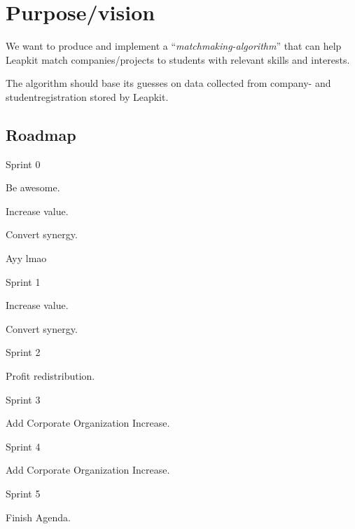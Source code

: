 \section{Purpose/vision}

We want to produce and implement a ``\emph{matchmaking-algorithm}''
that can help Leapkit match companies/projects to students with relevant
skills and interests.

The algorithm should base its guesses on data collected from company-
and studentregistration stored by Leapkit.

\subsection{Roadmap}
\begin{itemize*}
  \item Sprint 0
        \begin{enumerate*}
          \item Be awesome.
          \item Increase value.
          \item Convert synergy.
          \item Ayy lmao
        \end{enumerate*}
  \item Sprint 1
        \begin{enumerate*}
          \item Increase value.
          \item Convert synergy.
        \end{enumerate*}
  \item Sprint 2
        \begin{enumerate*}
          \item Profit redistribution.
        \end{enumerate*}
  \item Sprint 3
        \begin{enumerate*}
          \item Add Corporate Organization Increase.
        \end{enumerate*}
  \item Sprint 4
        \begin{enumerate*}
          \item Add Corporate Organization Increase.
        \end{enumerate*}
  \item Sprint 5
        \begin{enumerate*}
          \item Finish Agenda.
        \end{enumerate*}
\end{itemize*}
